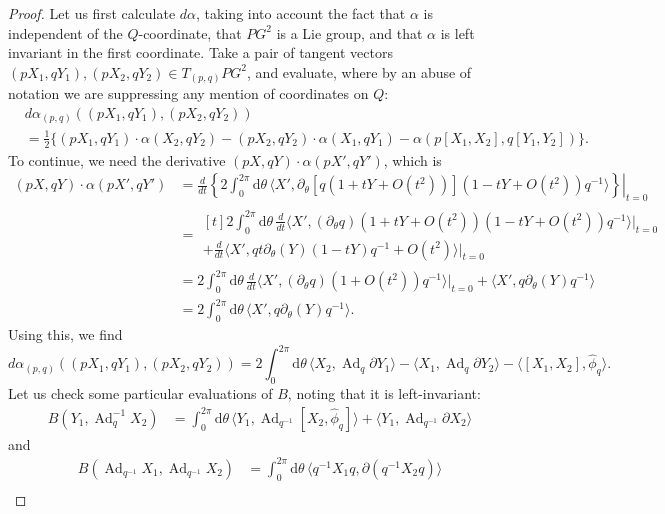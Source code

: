 \documentclass[10pt,a4paper]{amsart}
\DeclareMathOperator{\Ad}{Ad}
\newcommand{\intSone}{\int_{0}^{2\pi}\mathrm{d}\theta\,}
\newcommand{\phihat}{\widehat{\phi}}
\begin{document}
\begin{proof}
Let us first calculate $d\alpha$, taking into account the fact that $\alpha$ is independent of the $Q$-coordinate, that $PG^2$ is a Lie group, and that $\alpha$ is left invariant in the first coordinate.
Take a pair of tangent vectors $(pX_1,qY_1),(pX_2,qY_2) \in T_{(p,q)}PG^2$, and evaluate, where by an abuse of notation we are suppressing any mention of coordinates on $Q$:
\begin{align*}
&d\alpha_{(p,q)}\left((pX_1,qY_1),(pX_2,qY_2)\right) \\
& = \tfrac12 \Big\{
(pX_1,qY_1)\cdot \alpha(X_2,qY_2) - (pX_2,qY_2)\cdot \alpha(X_1,qY_1) 
- \alpha(p[X_1,X_2],q[Y_1,Y_2])
\Big\}.
\end{align*}
To continue, we need the derivative $(pX,qY)\cdot \alpha(pX',qY')$, which is
\begin{align*}
(pX,qY)\cdot \alpha(pX',qY') &=
\left.\frac{d}{dt} \left\{ 2\intSone \langle X',\partial_\theta[q(1+tY+O(t^2))](1-tY+O(t^2))q^{-1}\rangle\right\}\right|_{t=0}\\
& = \begin{multlined}[t]
2\intSone  \frac{d}{dt}\langle X',(\partial_\theta q)(1+tY+O(t^2))(1-tY+O(t^2))q^{-1}\rangle\big|_{t=0} \\
+
 \frac{d}{dt}\langle X',qt\partial_\theta(Y)(1-tY)q^{-1}+O(t^2)\rangle\big|_{t=0}  
\end{multlined}\\
& = 2\intSone  \frac{d}{dt}\langle X',(\partial_\theta q)(1+O(t^2))q^{-1}\rangle\big|_{t=0} 
+\langle X',q\partial_\theta(Y)q^{-1}\rangle \\
& = 2\intSone  \langle X',q\partial_\theta(Y)q^{-1}\rangle.
\end{align*}
Using this, we find
\[
d\alpha_{(p,q)}\left((pX_1,qY_1),(pX_2,qY_2)\right)=
2\intSone \langle X_2,\Ad_q\partial Y_1\rangle - \langle X_1 ,\Ad_q \partial Y_2\rangle - \langle [X_1,X_2],\phihat_q\rangle.
\]
Let us check some particular evaluations of $B$, noting that it is left-invariant:
\begin{align*}
  B(Y_1,\Ad_q^{-1}X_2) 
  &= \intSone \langle Y_1 ,\Ad_{q^{-1}}[X_2,\phihat_q]\rangle + \langle Y_1 ,\Ad_{q^{-1}}\partial X_2\rangle
\end{align*}
and 
\begin{align*}
B(\Ad_{q^{-1}}X_1,\Ad_{q^{-1}}X_2) 
& = \intSone \langle q^{-1}X_1q,\partial(q^{-1}X_2 q)\rangle\\

\end{align*}
\end{proof}
\end{document}
